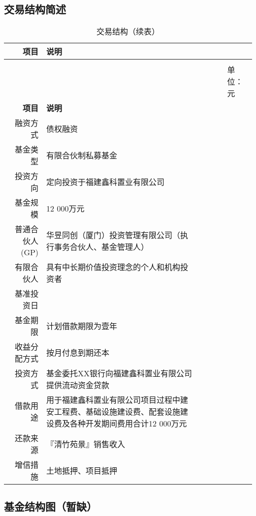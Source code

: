 \subsection{交易结构简述}
\renewcommand*{\arraystretch}{1}
\setlength{\tabcolsep}{8pt}
\begin{longtable}{>{\footnotesize}r>{\footnotesize}p{10cm}}
\caption[交易结构]{交易结构}\\  %
\hline\hline
{} \bfseries 项目 	& \bfseries 说明 \\  \endfirsthead          %
\caption[]{交易结构（续表）} \\ 
&&&&& {\scriptsize 单位：元}\\                        %
\hline\hline
{} \bfseries 项目 	& \bfseries 说明 \\ \endhead         %
\hline
\endfoot
\hline   %
融资方式    &   债权融资 \\
基金类型	&	有限合伙制私募基金	\\
投资方向	&	定向投资于福建鑫科置业有限公司	\\
基金规模	&	12 000万元 \\
普通合伙人(GP)	&	华昱同创（厦门）投资管理有限公司（执行事务合伙人、基金管理人）	\\
有限合伙人	&	具有中长期价值投资理念的个人和机构投资者	\\
基准投资日	&		\\
基金期限	 &	计划借款期限为壹年	\\
收益分配方式	&  按月付息到期还本		\\
投资方式	&	基金委托XX银行向福建鑫科置业有限公司提供流动资金贷款	\\
借款用途	&	用于福建鑫科置业有限公司项目过程中建安工程费、基础设施建设费、配套设施建设费及各种开发期间费用合计12 000万元	\\
还款来源	&	『清竹苑景』销售收入	\\
增信措施	&	土地抵押、项目抵押	\\
\bottomrule
\end{longtable}\label{cash}

\subsection{基金结构图（暂缺）}












